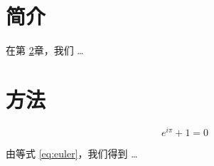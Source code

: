 \documentclass{article}
\begin{document}
\section{简介}
\label{sec:intro}

在第 \ref{sec:method}章，我们 \ldots

\section{方法}
\label{sec:method}

\begin{equation}
\label{eq:euler}
e^{i\pi} + 1 = 0
\end{equation}

由等式 \eqref{eq:euler}，我们得到 \ldots
\end{document}
